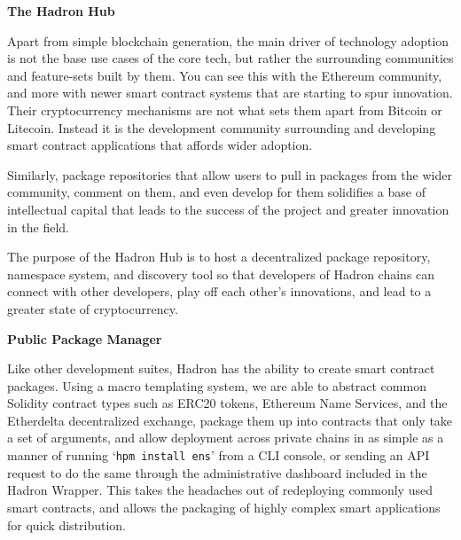 \documentclass{%
	article}
\begin{document}
\begin{center}
\textbf{The Hadron Hub}
\end{center}

Apart from simple blockchain generation, the main driver of technology adoption is not the base use cases of the core tech, but rather the surrounding communities and feature-sets built by them. You can see this with the Ethereum community, and more with newer smart contract systems that are starting to spur innovation. Their cryptocurrency mechanisms are not what sets them apart from Bitcoin or Litecoin. Instead it is the development community surrounding and developing smart contract applications that affords wider adoption.

Similarly, package repositories that allow users to pull in packages from the wider community, comment on them, and even develop for them solidifies a base of intellectual capital that leads to the success of the project and greater innovation in the field.

The purpose of the Hadron Hub is to host a decentralized package repository, namespace system, and discovery tool so that developers of Hadron chains can connect with other developers, play off each other's innovations, and lead to a greater state of cryptocurrency.

\begin{center}
\textbf{Public Package Manager}
\end{center}

Like other development suites, Hadron has the ability to create smart contract packages. Using a macro templating system, we are able to abstract common Solidity contract types such as ERC20 tokens, Ethereum Name Services, and the Etherdelta decentralized exchange, package them up into contracts that only take a set of arguments, and allow deployment across private chains in as simple as a manner of running ‘\texttt{hpm install ens}’ from a CLI console, or sending an API request to do the same through the administrative dashboard included in the Hadron Wrapper. This takes the headaches out of redeploying commonly used smart contracts, and allows the packaging of highly complex smart applications for quick distribution.
\end{document}
